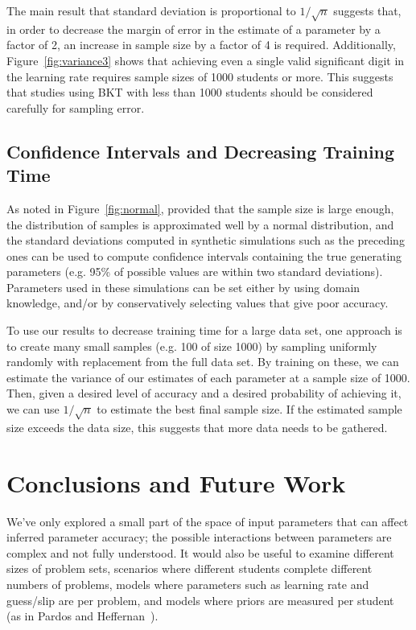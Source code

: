 \documentclass{edm_template}
\begin{document}
The main result that standard deviation is proportional to $1/\sqrt{n}$ suggests that, in order to decrease the margin of error in the estimate of a parameter by a factor of 2, an increase in sample size by a factor of 4 is required. Additionally, Figure~\ref{fig:variance3} shows that achieving even a single valid significant digit in the learning rate requires sample sizes of 1000 students or more. This suggests that studies using BKT with less than 1000 students should be considered carefully for sampling error.

\subsection{Confidence Intervals and Decreasing Training Time}

As noted in Figure~\ref{fig:normal}, provided that the sample size is large enough, the distribution of samples is approximated well by a normal distribution, and the standard deviations computed in synthetic simulations such as the preceding ones can be used to compute confidence intervals containing the true generating parameters (e.g. 95\% of possible values are within two standard deviations). Parameters used in these simulations can be set either by using domain knowledge, and/or by conservatively selecting values that give poor accuracy.

To use our results to decrease training time for a large data set, one approach is to create many small samples (e.g. 100 of size 1000) by sampling uniformly randomly with replacement from the full data set. By training on these, we can estimate the variance of our estimates of each parameter at a sample size of 1000. Then, given a desired level of accuracy and a desired probability of achieving it, we can use $1/\sqrt{n}$ to estimate the best final sample size. If the estimated sample size exceeds the data size, this suggests that more data needs to be gathered.

\section{Conclusions and Future Work}

We've only explored a small part of the space of input parameters that can affect inferred parameter accuracy; the possible interactions between parameters are complex and not fully understood. It would also be useful
to examine different sizes of problem sets, scenarios where different students complete different numbers
of problems, models where parameters such as learning rate and guess/slip are per problem, and models where priors are measured per student (as in Pardos and Heffernan~\cite{conf/um/PardosH10}).
\end{document}

